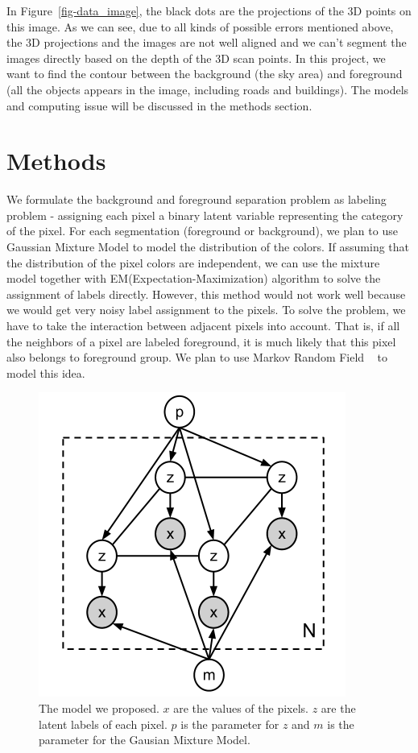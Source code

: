 \documentclass{article} %
\begin{document}
In Figure~\ref{fig-data_image}, the black dots are the projections of
the 3D points on this image. As we can see, due to all kinds of possible
errors mentioned above, the 3D projections and the images are not well
aligned and we can't segment the images directly based on the depth of
the 3D scan points. In this project, we want to find the contour
between the background (the sky area) and foreground (all the objects
appears in the image, including roads and buildings). The models and
computing issue will be discussed in the methods section.

\section{Methods}

We formulate the background and foreground separation
problem as labeling problem - assigning each pixel a binary latent
variable representing the category of the pixel. For each
segmentation (foreground or background), we plan to use Gaussian
Mixture Model to model the distribution of the colors. If assuming
that the distribution of the pixel colors are independent, we can use
the mixture model together with EM(Expectation-Maximization) algorithm
to solve the assignment of labels directly. However, this method would
not work well because we would get very noisy label assignment to the
pixels. To solve the problem, we have to take the interaction between
adjacent pixels into account. That is, if all the neighbors of a pixel are labeled
foreground, it is much likely that this pixel also belongs to
foreground group. We plan to use Markov Random Field
~\citep{Szeliski2008Comparative} to model this idea. 

\begin{figure}[ht]
\begin{center}
\includegraphics[height=0.5\linewidth]{./fig/graphical_model.png}
\end{center}
\caption{The model we proposed.  $x$ are the values of the
pixels. $z$ are the latent labels of each pixel. $p$ is the parameter
for $z$ and $m$ is the parameter for the Gausian Mixture Model.}
\label{fig-graphical_model}
\end{figure}
\end{document}
